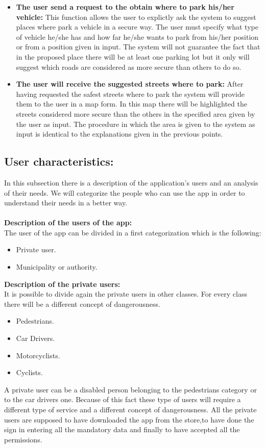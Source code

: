\documentclass[titlepage]{article}
\begin{document}
\begin{itemize}
	\item \textbf{The user send a request to the obtain where to park his/her vehicle:}
	This function allows the user to explictly ask the system to suggest places where park a vehicle in a secure way. 
The user must specify what type of vehicle he/she has and how far he/she wants to park from his/her position or from a position given in input. The system will not guarantee the fact that in the proposed place there will be at least one parking lot but it only will suggest which roads are considered as more secure than others to do so.
	\item \textbf{The user will receive the suggested streets where to park:}
	After having requested the safest streets where to park the system will provide them to the user in a map form. In this map there will be highlighted the streets considered more secure than the others in the specified area given by the user as input. The procedure in which the area is given to the system as input is identical to the explanations given in the previous points.

\end{itemize}
\subsection{User characteristics: }
In this subsection there is a description of the application's users and an analysis of their needs. We will categorize the people who can use the app in order to understand their needs in a better way.\\
\textbf{\\Description of the users of the app:\\}
The user of the app can be divided in a first categorization which is the following:
\begin{itemize}
	\item Private user.
	\item Municipality or authority.\\
\end{itemize}
\textbf{Description of the private users: }\\ 
It is possible to divide again the private users in other classes. For every class there will be a different concept of dangerousness.
\begin{itemize}
	\item Pedestrians.
	\item Car Drivers.
	\item Motorcyclists.
	\item Cyclists.
\end{itemize}
A private user can be a disabled person belonging to the pedestrians category or to the car drivers one. Because of this fact these type of users will require a different type of service and a different concept of dangerousness.
All the private users are supposed to have downloaded the app from the store,to have done the sign in entering all the mandatory data and finally to have accepted all the permissions.
\end{document}
